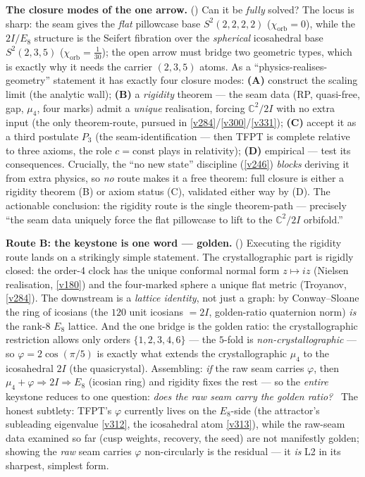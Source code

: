 \par\smallskip\noindent\textbf{The closure modes of the one arrow.} ()
Can it be \emph{fully} solved? The locus is sharp: the seam gives the \emph{flat} pillowcase base $S^2(2,2,2,2)$
($\chi_{\mathrm{orb}}=0$),
while the $2I/E_8$ structure is the Seifert fibration over the \emph{spherical} icosahedral base $S^2(2,3,5)$
($\chi_{\mathrm{orb}}=\tfrac1{30}$); the open arrow must bridge two geometric types, which is exactly why it needs
the carrier $(2,3,5)$ atoms. As a ``physics-realises-geometry'' statement it has exactly four closure modes:
\textbf{(A)} construct the scaling limit (the analytic wall); \textbf{(B)} a \emph{rigidity} theorem --- the seam
data (RP, quasi-free, gap, $\mu_4$, four marks) admit a \emph{unique} realisation, forcing $\mathbb{C}^2/2I$ with no
extra input (the only theorem-route, pursued in \vref{v284}/\vref{v300}/\vref{v331}); \textbf{(C)} accept it as a
third postulate $P_3$ (the seam-identification --- then TFPT is complete relative to three axioms, the role
$c{=}$const plays in relativity); \textbf{(D)} empirical --- test its consequences. Crucially, the ``no new state''
discipline (\vref{v246}) \emph{blocks} deriving it from extra physics, so \emph{no} route makes it a free theorem:
full closure is either a rigidity theorem (B) or axiom status (C), validated either way by (D). The actionable
conclusion: the rigidity route is the single theorem-path --- precisely ``the seam data uniquely force the flat
pillowcase to lift to the $\mathbb{C}^2/2I$ orbifold.''

\par\smallskip\noindent\textbf{Route B: the keystone is one word --- golden.} ()
Executing the rigidity route lands on a strikingly simple statement. The crystallographic part is rigidly closed:
the order-4 clock has the unique conformal normal form $z\mapsto iz$ (Nielsen realisation, \vref{v180}) and the
four-marked sphere a unique flat metric (Troyanov, \vref{v284}). The downstream is a \emph{lattice identity}, not
just a graph: by Conway--Sloane the ring of icosians (the $120$ unit icosians $=2I$, golden-ratio quaternion norm)
\emph{is} the rank-$8$ $E_8$ lattice. And the one bridge is the golden ratio: the crystallographic restriction
allows only orders $\{1,2,3,4,6\}$ --- the $5$-fold is \emph{non-crystallographic} --- so $\varphi=2\cos(\pi/5)$ is
exactly what extends the crystallographic $\mu_4$ to the icosahedral $2I$ (the quasicrystal). Assembling: \emph{if}
the raw seam carries $\varphi$, then $\mu_4+\varphi\Rightarrow 2I\Rightarrow E_8$ (icosian ring) and rigidity fixes
the rest --- so the \emph{entire} keystone reduces to one question: \emph{does the raw seam carry the golden ratio?}
\mO\ The honest subtlety: TFPT's $\varphi$ currently lives on the $E_8$-side (the attractor's subleading eigenvalue
\vref{v312}, the icosahedral atom \vref{v313}), while the raw-seam data examined so far (cusp weights, recovery,
the seed) are not manifestly golden; showing the \emph{raw} seam carries $\varphi$ non-circularly is the residual
--- it \emph{is} L2 in its sharpest, simplest form.

